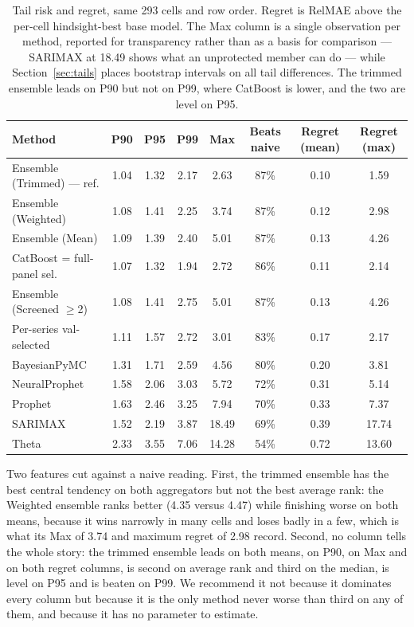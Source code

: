 \documentclass[11pt]{article}
\begin{document}
\begin{table}[htbp]\centering\small
\caption{Tail risk and regret, same 293 cells and row order. Regret is RelMAE above the per-cell hindsight-best base model. The Max column is a single observation per method, reported for transparency rather than as a basis for comparison --- SARIMAX at 18.49 shows what an unprotected member can do --- while Section~\ref{sec:tails} places bootstrap intervals on all tail differences. The trimmed ensemble leads on P90 but not on P99, where CatBoost is lower, and the two are level on P95.}
\label{tab:tails}
\begin{tabular}{lccccccc}
\toprule
Method & P90 & P95 & P99 & Max & Beats naive & Regret (mean) & Regret (max) \\
\midrule
Ensemble (Trimmed) --- ref. & 1.04 & 1.32 & 2.17 & 2.63 & 87\% & 0.10 & 1.59 \\
Ensemble (Weighted) & 1.08 & 1.41 & 2.25 & 3.74 & 87\% & 0.12 & 2.98 \\
Ensemble (Mean) & 1.09 & 1.39 & 2.40 & 5.01 & 87\% & 0.13 & 4.26 \\
CatBoost = full-panel sel. & 1.07 & 1.32 & 1.94 & 2.72 & 86\% & 0.11 & 2.14 \\
Ensemble (Screened $\geq$2) & 1.08 & 1.41 & 2.75 & 5.01 & 87\% & 0.13 & 4.26 \\
Per-series val-selected & 1.11 & 1.57 & 2.72 & 3.01 & 83\% & 0.17 & 2.17 \\
BayesianPyMC & 1.31 & 1.71 & 2.59 & 4.56 & 80\% & 0.20 & 3.81 \\
NeuralProphet & 1.58 & 2.06 & 3.03 & 5.72 & 72\% & 0.31 & 5.14 \\
Prophet & 1.63 & 2.46 & 3.25 & 7.94 & 70\% & 0.33 & 7.37 \\
SARIMAX & 1.52 & 2.19 & 3.87 & 18.49 & 69\% & 0.39 & 17.74 \\
Theta & 2.33 & 3.55 & 7.06 & 14.28 & 54\% & 0.72 & 13.60 \\
\bottomrule
\end{tabular}
\end{table}

Two features cut against a naive reading. First, the trimmed ensemble has the best central tendency on both aggregators but not the best average rank: the Weighted ensemble ranks better (4.35 versus 4.47) while finishing worse on both means, because it wins narrowly in many cells and loses badly in a few, which is what its Max of 3.74 and maximum regret of 2.98 record. Second, no column tells the whole story: the trimmed ensemble leads on both means, on P90, on Max and on both regret columns, is second on average rank and third on the median, is level on P95 and is beaten on P99. We recommend it not because it dominates every column but because it is the only method never worse than third on any of them, and because it has no parameter to estimate.
\end{document}
